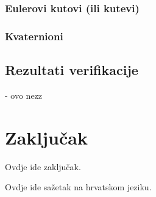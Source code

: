 \documentclass[times, utf8, diplomski, numeric]{templates/template}
\begin{document}
{{        \subsection{Eulerovi kutovi (ili kutevi)}{
            \iffalse
            - staviti formulu iz matlaba
            \fi
        }

        \subsection{Kvaternioni}{
            \iffalse
            - staviti formule iz onog papera od josipa
            \fi
        }
    }

    \section{Rezultati verifikacije}{
        - ovo nezz
    }
}

\chapter{Zaključak}{
    Ovdje ide zaključak.
}




\begin{sazetak}{
    Ovdje ide sažetak na hrvatskom jeziku.
}

\end{sazetak}

\begin{abstract}{
    Add abstract here.
}

\end{abstract}
\end{document}
